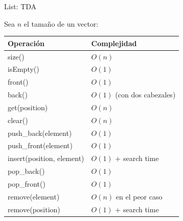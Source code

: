 \documentclass{beamer} %
\begin{document}
\begin{frame}{List: TDA}
    \scriptsize{
    Sea $n$ el tamaño de un vector:

    \begin{center}
    \begin{tabular}{ll}\hline
      {\bf Operación}   & {\bf Complejidad}\\\hline
      size()            & $O(n)$\\
      isEmpty()         & $O(1)$\\
      front()           & $O(1)$\\
      back()            & $O(1)$ (con dos cabezales)\\
      get(position)     & $O(n)$\\
      clear()           & $O(n)$\\
      push\_back(element)  & $O(1)$\\
      push\_front(element) & $O(1)$\\
      insert(position, element) & $O(1)$ + search time\\
      pop\_back()       & $O(1)$\\
      pop\_front()      & $O(1)$\\
      remove(element)   & $O(n)$ en el peor caso\\
      remove(position)  & $O(1)$ + search time\\[1.5ex]\hline
    \end{tabular}
    \end{center}}
\end{frame}
\end{document}
